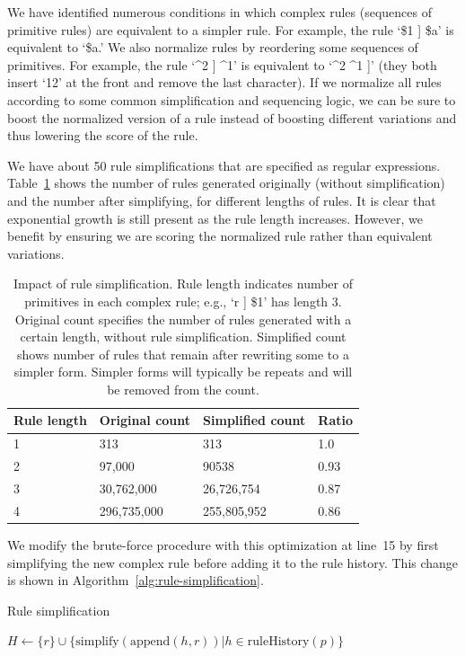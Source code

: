 \documentclass[letterpaper,twocolumn,10pt]{article}
\begin{document}
We have identified numerous conditions in which complex rules (sequences of
primitive rules) are equivalent to a simpler rule. For example, the rule `\$1 ]
\$a' is equivalent to `\$a.' We also normalize rules by reordering some
sequences of primitives. For example, the rule `\^{}2 ] \^{}1' is equivalent to
`\^{}2 \^{}1 ]' (they both insert `12' at the front and remove the last
character). If we normalize all rules according to some common simplification
and sequencing logic, we can be sure to boost the normalized version of a rule
instead of boosting different variations and thus lowering the score of the
rule.

We have about 50 rule simplifications that are specified as regular
expressions. Table~\ref{tab:rule-simplification} shows the number of rules
generated originally (without simplification) and the number after simplifying,
for different lengths of rules. It is clear that exponential growth is still
present as the rule length increases. However, we benefit by ensuring we are
scoring the normalized rule rather than equivalent variations.

\begin{table}
\centering
\begin{tabular}{|l|l|l|l|}
\hline
Rule length & Original count & Simplified count & Ratio \\
\hline
1 & 313 & 313 & 1.0 \\
2 & 97,000 & 90538 & 0.93 \\
3 & 30,762,000 & 26,726,754 & 0.87 \\
4 & 296,735,000 & 255,805,952 & 0.86 \\
\hline
\end{tabular}
\caption{Impact of rule simplification. Rule length indicates number of
primitives in each complex rule; e.g., `r ] \$1' has length 3. Original count
specifies the number of rules generated with a certain length, without rule
simplification. Simplified count shows number of rules that remain after
rewriting some to a simpler form. Simpler forms will typically be repeats and
will be removed from the count.}
\label{tab:rule-simplification}
\end{table}

We modify the brute-force procedure with this optimization at line~15 by
first simplifying the new complex rule before adding it to the rule history.
This change is shown in Algorithm~\ref{alg:rule-simplification}.

\begin{algorithm}\caption{Rule simplification}
\begin{algorithmic}
    \State $H \gets \{r\}\cup\{\mathrm{simplify}(\mathrm{append}(h, r))|h \in%
\mathrm{ruleHistory}(p)\}$
\end{algorithmic}
\label{alg:rule-simplification}
\end{algorithm}
\end{document}
